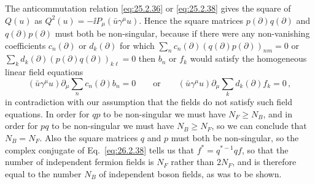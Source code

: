 The anticommutation relation \eqref{eq:25.2.36} or \eqref{eq:25.2.38} gives
the square of $Q(u)$ as $Q^2(u)=-\ii P_\mu(\bar u\gamma^\mu u)$. Hence the
square matrices $p(\partial)q(\partial)$ and $q(\partial)p(\partial)$ must
both be non-singular, because if there were any non-vanishing coefficients
$c_n(\partial)$ or $d_k(\partial)$ for which
$\sum_n c_n(\partial)(q(\partial)p(\partial))_{nm}=0$ or
$\sum_k d_k(\partial)(p(\partial)q(\partial))_{k\ell}=0$ then $b_n$ or $f_k$
would satisfy the homogeneous linear field equations
\[
  (\bar u\gamma^\mu u)\partial_\mu
    \sum_n c_n(\partial)b_n=0
  \qquad\text{or}\qquad
  (\bar u\gamma^\mu u)\partial_\mu
    \sum_k d_k(\partial)f_k=0\,,
\]
in contradiction with our assumption that the fields do not satisfy such
field equations. In order for $qp$ to be non-singular we must have
$N_F\geq N_B$, and in order for $pq$ to be non-singular we must have
$N_B\geq N_F$, so we can conclude that $N_B=N_F$. Also the square matrices
$q$ and $p$ must both be non-singular, so the complex conjugate of
Eq.~\eqref{eq:26.2.38} tells us that $f^*=q^{*-1}qf$, so that the number of
independent fermion fields is $N_F$ rather than $2N_F$, and is therefore
equal to the number $N_B$ of independent boson fields, as was to be shown.
